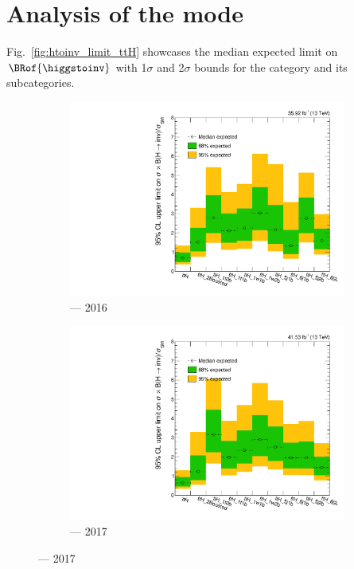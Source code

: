 

\section{Analysis of the \texorpdfstring{\ttH}{ttH} mode}
\label{sec:htoinv_analysis_ttH}


Fig.~\ref{fig:htoinv_limit_ttH} showcases the median expected limit on $\BRof{\higgstoinv}$ with 1$\sigma$ and 2$\sigma$ bounds for the \ttH category and its subcategories.

\begin{figure}[htbp]
    \centering
    \begin{subfigure}[b]{0.45\textwidth}
        \includegraphics[width=\textwidth]{figures/limits/ttH/limit_2016_ttH_Scenario5.pdf}
        \caption{\ttH --- 2016}
    \end{subfigure}
    \hfill
    \begin{subfigure}[b]{0.45\textwidth}
        \includegraphics[width=\textwidth]{figures/limits/ttH/limit_2017_ttH_Scenario5.pdf}
        \caption{\ttH --- 2017}
    \end{subfigure}


\end{figure}
